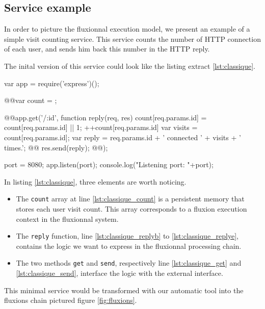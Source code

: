 
\subsection{Service example}

In order to picture the fluxionnal execution model, we present an example of a simple visit counting service.
This service counts the number of HTTP connection of each user, and sends him back this number in the HTTP reply.

The inital version of this service could look like the listing extract \ref{lst:classique}.

\begin{code}[Javascript, caption={Initial service},label={lst:classique}]
var app = require('express')();

@\label{lst:classique_count}@var count = {};

@\label{lst:classique_get}\label{lst:classique_replyb}@app.get('/:id', function reply(req, res){
  count[req.params.id] = count[req.params.id]  || 1;
  ++count[req.params.id]
  var visits = count[req.params.id];
  var reply = req.params.id + ' connected ' + visits + ' times.';
@\label{lst:classique_send}@  res.send(reply);
@\label{lst:classique_replye}@});

port = 8080;
app.listen(port);
console.log("Listening port: "+port);
\end{code}

In listing \ref{lst:classique}, three elements are worth noticing.

\begin{itemize}
  \item The \texttt{count} array at line \ref{lst:classique_count} is a persistent memory that stores each user visit count.
  This array corresponds to a fluxion execution context in the fluxionnal system.
  \item The \texttt{reply} function, line \ref{lst:classique_replyb} to \ref{lst:classique_replye}, contains the logic we want to express in the fluxionnal processing chain.
  \item The two methods \texttt{get} and \texttt{send}, respectively line \ref{lst:classique_get} and \ref{lst:classique_send}, interface the logic with the external interface.
\end{itemize}

This minimal service would be transformed with our automatic tool into the fluxions chain pictured figure \ref{fig:fluxions}.


